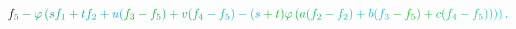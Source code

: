 \documentclass[12pt]{article}
\begin{document}
\begin{displaymath}
{f} _ { \mathcolor[RGB]{0,165,60}{5} } \mathcolor[RGB]{0,165,75}{-} \mathcolor[RGB]{0,165,90}{\varphi} \mathcolor[RGB]{0,165,105}{\left(} \mathcolor[RGB]{0,165,120}{s} \mathcolor[RGB]{0,165,135}{f} _ { \mathcolor[RGB]{0,165,150}{1} } \mathcolor[RGB]{0,165,165}{+} \mathcolor[RGB]{0,165,180}{t} \mathcolor[RGB]{0,165,195}{f} _ { \mathcolor[RGB]{0,165,210}{2} } \mathcolor[RGB]{0,165,225}{+} \mathcolor[RGB]{0,165,240}{u} \mathcolor[RGB]{0,165,255}{(} \mathcolor[RGB]{0,180,0}{f} _ { \mathcolor[RGB]{0,180,15}{3} } \mathcolor[RGB]{0,180,30}{-} \mathcolor[RGB]{0,180,45}{f} _ { \mathcolor[RGB]{0,180,60}{5} } \mathcolor[RGB]{0,180,75}{)} \mathcolor[RGB]{0,180,90}{+} \mathcolor[RGB]{0,180,105}{v} \mathcolor[RGB]{0,180,120}{(} \mathcolor[RGB]{0,180,135}{f} _ { \mathcolor[RGB]{0,180,150}{4} } \mathcolor[RGB]{0,180,165}{-} \mathcolor[RGB]{0,180,180}{f} _ { \mathcolor[RGB]{0,180,195}{5} } \mathcolor[RGB]{0,180,210}{)} \mathcolor[RGB]{0,180,225}{-} \mathcolor[RGB]{0,180,240}{(} \mathcolor[RGB]{0,180,255}{s} \mathcolor[RGB]{0,195,0}{+} \mathcolor[RGB]{0,195,15}{t} \mathcolor[RGB]{0,195,30}{)} \mathcolor[RGB]{0,195,45}{\varphi} \mathcolor[RGB]{0,195,60}{\left(} \mathcolor[RGB]{0,195,75}{a} \mathcolor[RGB]{0,195,90}{(} \mathcolor[RGB]{0,195,105}{f} _ { \mathcolor[RGB]{0,195,120}{2} } \mathcolor[RGB]{0,195,135}{-} \mathcolor[RGB]{0,195,150}{f} _ { \mathcolor[RGB]{0,195,165}{2} } \mathcolor[RGB]{0,195,180}{)} \mathcolor[RGB]{0,195,195}{+} \mathcolor[RGB]{0,195,210}{b} \mathcolor[RGB]{0,195,225}{(} \mathcolor[RGB]{0,195,240}{f} _ { \mathcolor[RGB]{0,195,255}{3} } \mathcolor[RGB]{0,210,0}{-} \mathcolor[RGB]{0,210,15}{f} _ { \mathcolor[RGB]{0,210,30}{5} } \mathcolor[RGB]{0,210,45}{)} \mathcolor[RGB]{0,210,60}{+} \mathcolor[RGB]{0,210,75}{c} \mathcolor[RGB]{0,210,90}{(} \mathcolor[RGB]{0,210,105}{f} _ { \mathcolor[RGB]{0,210,120}{4} } \mathcolor[RGB]{0,210,135}{-} \mathcolor[RGB]{0,210,150}{f} _ { \mathcolor[RGB]{0,210,165}{5} } \mathcolor[RGB]{0,210,180}{)} \mathcolor[RGB]{0,210,195}{)} \mathcolor[RGB]{0,210,210}{\right)} \mathcolor[RGB]{0,210,225}{\right)} \mathcolor[RGB]{0,210,240}{.}
\end{displaymath}
\end{document}
